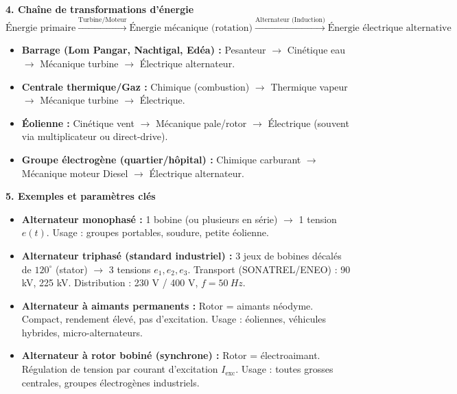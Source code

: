 \documentclass[11pt]{article}
\begin{document}
\begin{aretenir}
\textbf{4. Chaîne de transformations d'énergie}
\[
\boxed{\text{\'Energie primaire}} \xrightarrow{\text{Turbine/Moteur}} \boxed{\text{\'Energie mécanique (rotation)}} \xrightarrow{\text{Alternateur (Induction)}} \boxed{\text{\'Energie électrique alternative}}
\]
\begin{itemize}
    \item \textbf{Barrage (Lom Pangar, Nachtigal, Edéa) :} Pesanteur $\rightarrow$ Cinétique eau $\rightarrow$ Mécanique turbine $\rightarrow$ Électrique alternateur.
    \item \textbf{Centrale thermique/Gaz :} Chimique (combustion) $\rightarrow$ Thermique vapeur $\rightarrow$ Mécanique turbine $\rightarrow$ Électrique.
    \item \textbf{Éolienne :} Cinétique vent $\rightarrow$ Mécanique pale/rotor $\rightarrow$ Électrique (souvent via multiplicateur ou direct-drive).
    \item \textbf{Groupe électrogène (quartier/hôpital) :} Chimique carburant $\rightarrow$ Mécanique moteur Diesel $\rightarrow$ Électrique alternateur.
\end{itemize}

\textbf{5. Exemples et paramètres clés}
\begin{itemize}
    \item \textbf{Alternateur monophasé :} 1 bobine (ou plusieurs en série) $\rightarrow$ 1 tension $e(t)$. Usage : groupes portables, soudure, petite éolienne.
    \item \textbf{Alternateur triphasé (standard industriel) :} 3 jeux de bobines décalés de $120^\circ$ (stator) $\rightarrow$ 3 tensions $e_1, e_2, e_3$. Transport (SONATREL/ENEO) : 90 kV, 225 kV. Distribution : 230 V / 400 V, $f = \SI{50}{Hz}$.
    \item \textbf{Alternateur à aimants permanents :} Rotor = aimants néodyme. Compact, rendement élevé, pas d'excitation. Usage : éoliennes, véhicules hybrides, micro-alternateurs.
    \item \textbf{Alternateur à rotor bobiné (synchrone) :} Rotor = électroaimant. Régulation de tension par courant d'excitation $I_{\text{exc}}$. Usage : toutes grosses centrales, groupes électrogènes industriels.
\end{itemize}
\end{aretenir}
\end{document}
